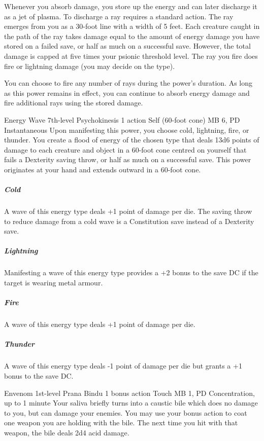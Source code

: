   Whenever you absorb damage,
  you store up the energy and can later discharge it
  as a jet of plasma.
  To discharge a ray requires a standard action.
  The ray emerges from you as a 30-foot line with
  a width of 5 feet.
  Each creature caught in the path of the ray
  takes damage equal to the amount of energy damage you have stored
  on a failed save,
  or half as much on a successful save.
  However,
  the total damage is capped at five times your psionic threshold level.
  The ray you fire does fire or lightning damage
  (you may decide on the type).
  
  You can choose to fire any number of rays
  during the power's duration.
  As long as this power remains in effect,
  you can continue to absorb energy damage and
  fire additional rays using the stored damage.

\DndPowerHeader%
  {Energy Wave}
  {7th-level Psychokinesis}
  {1 action}
  {Self (60-foot cone)}
  {MB 6, PD \lvlseven}
  {Instantaneous}
  Upon manifesting this power,
  you choose cold, lightning, fire, or thunder.
  You create a flood of energy of the chosen type
  that deals 13d6 points of damage
  to each creature and object in a 60-foot cone
  centred on yourself
  that fails a Dexterity saving throw,
  or half as much on a successful save.
  This power originates at your hand
  and extends outward in a 60-foot cone.
  \subparagraph{Cold}
    A wave of this energy type deals +1 point
    of damage per die.
    The saving throw to reduce damage from a cold wave
    is a Constitution save instead of a Dexterity save.  
  \subparagraph{Lightning}
    Manifesting a wave of this energy type
    provides a +2 bonus to the save DC if the target is wearing
    metal armour.
  \subparagraph{Fire}
    A wave of this energy type deals +1 point of damage per die.
  \subparagraph{Thunder}
    A wave of this energy type deals -1 point of damage per die
    but grants a +1 bonus to the save DC.

\DndPowerHeader%
  {Envenom}
  {1st-level Prana Bindu}
  {1 bonus action}
  {Touch}
  {MB 1, PD \lvlone}
  {Concentration, up to 1 minute}
Your saliva briefly turns into a caustic bile
which does no damage to you,
but can damage your enemies.
You may use your bonus action to coat one weapon
you are holding with the bile.
The next time you hit with that weapon,
the bile deals 2d4 acid damage.

